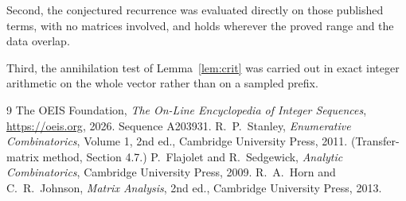\documentclass[11pt,a4paper]{article}
\theoremstyle{plain}
\theoremstyle{definition}
\begin{document}
Second, the conjectured recurrence was evaluated directly on those published terms, with no
matrices involved, and holds wherever the proved range and the data overlap.

Third, the annihilation test of Lemma~\ref{lem:crit} was carried out in exact integer
arithmetic on the whole vector rather than on a sampled prefix.

\begin{thebibliography}{9}
 The OEIS Foundation, \emph{The On-Line Encyclopedia of Integer
Sequences}, \url{https://oeis.org}, 2026. Sequence A203931.
 R.~P.~Stanley, \emph{Enumerative Combinatorics}, Volume 1, 2nd ed.,
Cambridge University Press, 2011. (Transfer-matrix method, Section 4.7.)
 P.~Flajolet and R.~Sedgewick, \emph{Analytic Combinatorics}, Cambridge
University Press, 2009.
 R.~A.~Horn and C.~R.~Johnson, \emph{Matrix Analysis}, 2nd ed., Cambridge
University Press, 2013.
\end{thebibliography}
\end{document}
